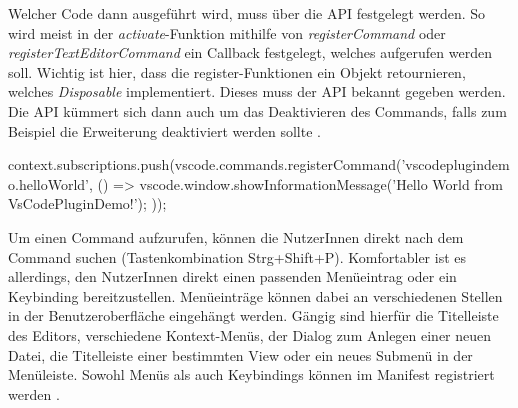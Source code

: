   Welcher Code dann ausgeführt wird, muss über die API festgelegt werden. So wird meist
  in der \emph{activate}-Funktion mithilfe von \emph{registerCommand} oder \emph{registerTextEditorCommand}
  ein Callback festgelegt, welches aufgerufen werden soll. Wichtig ist hier, dass
  die register-Funktionen ein Objekt retournieren, welches \emph{Disposable} implementiert.
  Dieses muss der API bekannt gegeben werden. 
  Die API kümmert sich dann auch um das Deaktivieren des Commands, falls zum Beispiel
  die Erweiterung deaktiviert werden sollte \cite{VSCodeExtensionAPICommands}.
\begin{JsCode}
    context.subscriptions.push(vscode.commands.registerCommand('vscodeplugindemo.helloWorld', () => {
      vscode.window.showInformationMessage('Hello World from VsCodePluginDemo!');
    })); 
\end{JsCode}

  Um einen Command aufzurufen, können die NutzerInnen direkt nach dem Command suchen (Tastenkombination Strg+Shift+P).
  Komfortabler ist es allerdings, den NutzerInnen direkt einen passenden Menüeintrag oder ein Keybinding
  bereitzustellen. Menüeinträge können dabei an verschiedenen Stellen in der
  Benutzeroberfläche eingehängt werden.
  Gängig sind hierfür die Titelleiste des Editors, verschiedene Kontext-Menüs, der Dialog
  zum Anlegen einer neuen Datei, die Titelleiste einer bestimmten View oder ein neues Submenü in der Menüleiste.
  Sowohl Menüs als auch Keybindings können im Manifest registriert werden
  \cite{VSCodeExtensionAPIContributionPointsMenus}.
